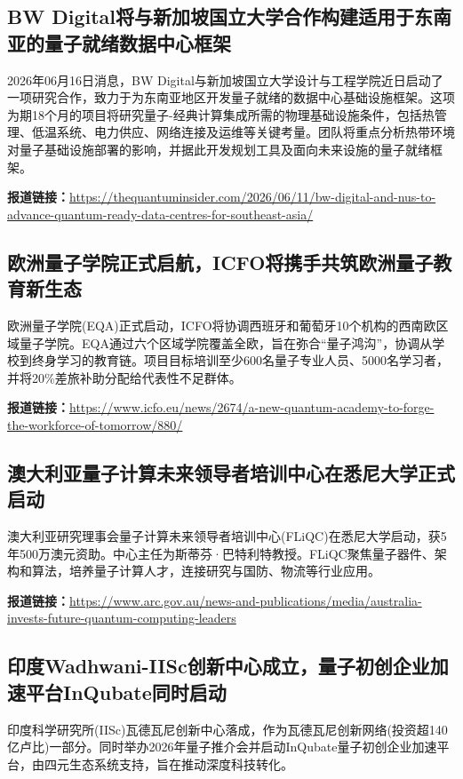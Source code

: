 \documentclass[12pt,a4paper]{ctexart}
\begin{document}
\subsection{ BW Digital将与新加坡国立大学合作构建适用于东南亚的量子就绪数据中心框架 }

2026年06月16日消息，BW Digital与新加坡国立大学设计与工程学院近日启动了一项研究合作，致力于为东南亚地区开发量子就绪的数据中心基础设施框架。这项为期18个月的项目将研究量子-经典计算集成所需的物理基础设施条件，包括热管理、低温系统、电力供应、网络连接及运维等关键考量。团队将重点分析热带环境对量子基础设施部署的影响，并据此开发规划工具及面向未来设施的量子就绪框架。

\noindent\textbf{报道链接：}\url{https://thequantuminsider.com/2026/06/11/bw-digital-and-nus-to-advance-quantum-ready-data-centres-for-southeast-asia/}

\subsection{ 欧洲量子学院正式启航，ICFO将携手共筑欧洲量子教育新生态 }

欧洲量子学院(EQA)正式启动，ICFO将协调西班牙和葡萄牙10个机构的西南欧区域量子学院。EQA通过六个区域学院覆盖全欧，旨在弥合“量子鸿沟”，协调从学校到终身学习的教育链。项目目标培训至少600名量子专业人员、5000名学习者，并将20\%差旅补助分配给代表性不足群体。

\noindent\textbf{报道链接：}\url{https://www.icfo.eu/news/2674/a-new-quantum-academy-to-forge-the-workforce-of-tomorrow/880/}

\subsection{ 澳大利亚量子计算未来领导者培训中心在悉尼大学正式启动 }

澳大利亚研究理事会量子计算未来领导者培训中心(FLiQC)在悉尼大学启动，获5年500万澳元资助。中心主任为斯蒂芬·巴特利特教授。FLiQC聚焦量子器件、架构和算法，培养量子计算人才，连接研究与国防、物流等行业应用。

\noindent\textbf{报道链接：}\url{https://www.arc.gov.au/news-and-publications/media/australia-invests-future-quantum-computing-leaders}

\subsection{ 印度Wadhwani-IISc创新中心成立，量子初创企业加速平台InQubate同时启动 }

印度科学研究所(IISc)瓦德瓦尼创新中心落成，作为瓦德瓦尼创新网络(投资超140亿卢比)一部分。同时举办2026年量子推介会并启动InQubate量子初创企业加速平台，由四元生态系统支持，旨在推动深度科技转化。
\end{document}
